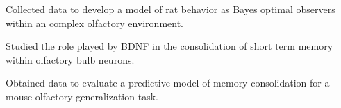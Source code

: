 \documentclass[letterpaper]{deedy-resume} %
\begin{document}
\begin{minipage}[t]{0.66\textwidth}
\vspace{\topsep} %
\begin{tightitemize}
\item Collected data to develop a model of rat behavior as Bayes optimal observers within an complex olfactory environment.
\item Studied the role played by BDNF in the consolidation of short term memory within olfactory bulb neurons.
\item Obtained data to evaluate a predictive model of memory consolidation for a mouse olfactory generalization task.
\end{tightitemize}

\sectionspace %


\end{minipage} %
\end{document}
